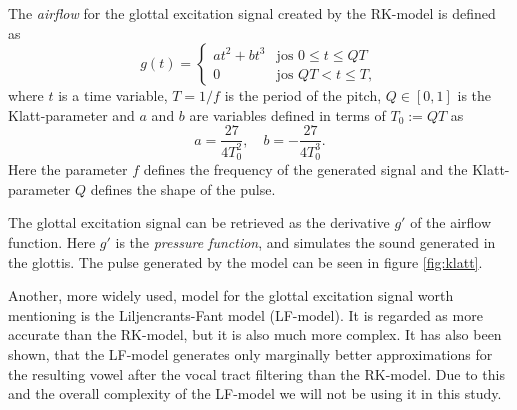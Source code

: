 \documentclass[12pt,a4]{article}
\begin{document}
The \emph{airflow} for the glottal excitation signal created by the RK-model is defined as
\begin{equation}
\label{eq:RK-model}
g(t) =
  \begin{cases}
   at^2 + bt^3  & \text{jos } 0 \leq t \leq Q T \\
   0            & \text{jos } Q T < t \leq T,
  \end{cases}
\end{equation}
where $t$ is a time variable, $T = 1/f$ is the period of the pitch, $Q \in \left[ 0,1 \right]$ is the Klatt-parameter and $a$ and $b$ are variables defined in terms of $T_0 := QT$ as
\begin{equation*}
a = \frac{27}{4 T_0^2}, \quad b = -\frac{27}{4 T_0^3} .
\end{equation*}
Here the parameter $f$ defines the frequency of the generated signal and the Klatt-parameter $Q$ defines the shape of the pulse.

The glottal excitation signal can be retrieved as the derivative $g'$ of the airflow function. Here $g'$ is the \emph{pressure function}, and simulates the sound generated in the glottis. The pulse generated by the model can be seen in figure \ref{fig:klatt}.

Another, more widely used, model for the glottal excitation signal worth mentioning is the Liljencrants-Fant model (LF-model).\cite{fant} It is regarded as more accurate than the RK-model, but it is also much more complex. It has also been shown, that the LF-model generates only marginally better approximations for the resulting vowel after the vocal tract filtering than the RK-model.\cite{fujisaki} Due to this and the overall complexity of the LF-model we will not be using it in this study.
\end{document}

